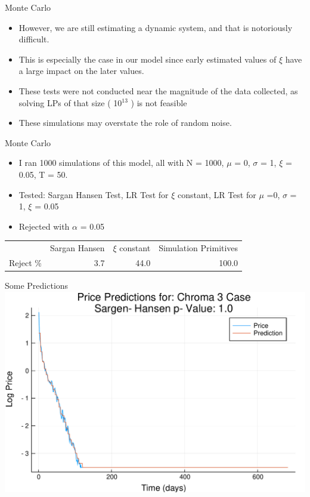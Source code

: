 \documentclass[bigger]{beamer}
\begin{document}
\begin{frame}[label=sec-1-20]{Monte Carlo}
\begin{itemize}
\item However, we are still estimating a dynamic system, and that is
notoriously difficult.
\item This is especially the case in our model since early estimated
values of $\xi$ have a large impact on the later values.
\item These tests were not conducted near the magnitude of the data
collected, as solving LPs of that size ( 10$^{\text{13}}$ ) is not feasible
\item These simulations may overstate the role of random noise.
\end{itemize}
\end{frame}

\begin{frame}[label=sec-1-21]{Monte Carlo}
\begin{itemize}
\item I ran 1000 simulations of this model, all with N = 1000, $\mu$ = 0, $\sigma$ =
1, $\xi$ = 0.05, T = 50.
\item Tested: Sargan Hansen Test, LR Test for $\xi$ constant, LR Test for $\mu$
  =0, $\sigma$ = 1, $\xi$ = 0.05
\item Rejected with $\alpha$ = 0.05
\end{itemize}

\begin{center}
\begin{tabular}{lrrr}
 & Sargan Hansen & $\xi$ constant & Simulation Primitives\\
Reject \% & 3.7 & 44.0 & 100.0\\
\end{tabular}
\end{center}
\end{frame}


\begin{frame}[label=sec-1-22]{Some Predictions}
\includegraphics[width=.9\linewidth]{../Plots/Cases/Cases/Chroma3Case.pdf}
\end{frame}
\end{document}
